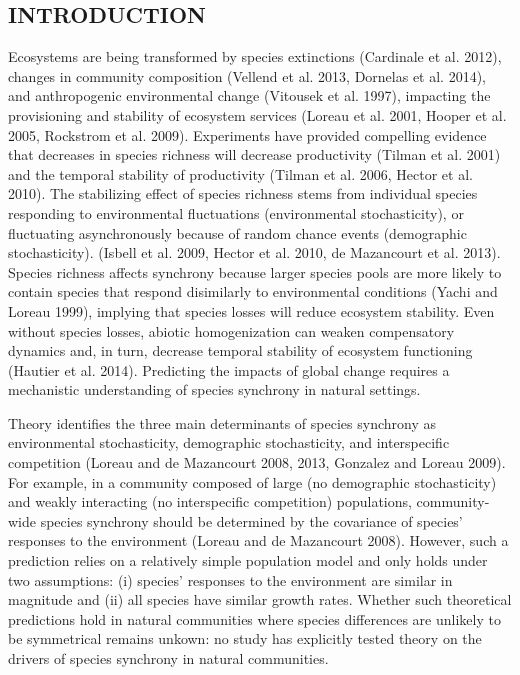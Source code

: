 \documentclass[12pt,]{article}
\begin{document}
\newpage{} \setlength{\parindent}{5ex}

\subsection{INTRODUCTION}\label{introduction}

Ecosystems are being transformed by species extinctions (Cardinale et
al. 2012), changes in community composition (Vellend et al. 2013,
Dornelas et al. 2014), and anthropogenic environmental change (Vitousek
et al. 1997), impacting the provisioning and stability of ecosystem
services (Loreau et al. 2001, Hooper et al. 2005, Rockstrom et al.
2009). Experiments have provided compelling evidence that decreases in
species richness will decrease productivity (Tilman et al. 2001) and the
temporal stability of productivity (Tilman et al. 2006, Hector et al.
2010). The stabilizing effect of species richness stems from individual
species responding to environmental fluctuations (environmental
stochasticity), or fluctuating asynchronously because of random chance
events (demographic stochasticity). (Isbell et al. 2009, Hector et al.
2010, {{de Mazancourt}} et al. 2013). Species richness affects synchrony
because larger species pools are more likely to contain species that
respond disimilarly to environmental conditions (Yachi and Loreau 1999),
implying that species losses will reduce ecosystem stability. Even
without species losses, abiotic homogenization can weaken compensatory
dynamics and, in turn, decrease temporal stability of ecosystem
functioning (Hautier et al. 2014). Predicting the impacts of global
change requires a mechanistic understanding of species synchrony in
natural settings.

Theory identifies the three main determinants of species synchrony as
environmental stochasticity, demographic stochasticity, and
interspecific competition (Loreau and {{de Mazancourt}} 2008, 2013,
Gonzalez and Loreau 2009). For example, in a community composed of large
(no demographic stochasticity) and weakly interacting (no interspecific
competition) populations, community-wide species synchrony should be
determined by the covariance of species' responses to the environment
(Loreau and {{de Mazancourt}} 2008). However, such a prediction relies
on a relatively simple population model and only holds under two
assumptions: (i) species' responses to the environment are similar in
magnitude and (ii) all species have similar growth rates. Whether such
theoretical predictions hold in natural communities where species
differences are unlikely to be symmetrical remains unkown: no study has
explicitly tested theory on the drivers of species synchrony in natural
communities.
\end{document}
